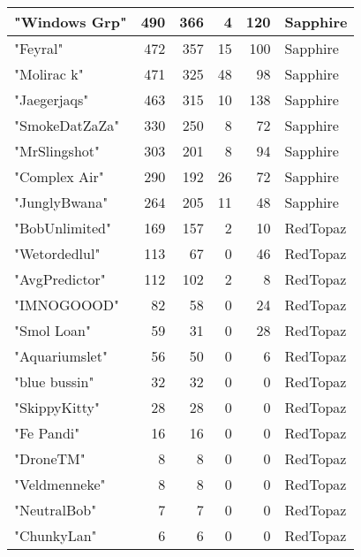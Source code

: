 \documentclass{article}
\begin{document}
\begin{table}[htbp]
\begin{tabular}{|l|r|r|r|r|l|}
"Windows Grp" & 490 & 366 & 4 & 120 & Sapphire \\ \hline
"Feyral" & 472 & 357 & 15 & 100 & Sapphire \\ \hline
"Molirac k" & 471 & 325 & 48 & 98 & Sapphire \\ \hline
"Jaegerjaqs" & 463 & 315 & 10 & 138 & Sapphire \\ \hline
"SmokeDatZaZa" & 330 & 250 & 8 & 72 & Sapphire \\ \hline
"MrSlingshot" & 303 & 201 & 8 & 94 & Sapphire \\ \hline
"Complex Air" & 290 & 192 & 26 & 72 & Sapphire \\ \hline
"JunglyBwana" & 264 & 205 & 11 & 48 & Sapphire \\ \hline
"BobUnlimited" & 169 & 157 & 2 & 10 & RedTopaz \\ \hline
"Wetordedlul" & 113 & 67 & 0 & 46 & RedTopaz \\ \hline
"AvgPredictor" & 112 & 102 & 2 & 8 & RedTopaz \\ \hline
"IMNOGOOOD" & 82 & 58 & 0 & 24 & RedTopaz \\ \hline
"Smol Loan" & 59 & 31 & 0 & 28 & RedTopaz \\ \hline
"Aquariumslet" & 56 & 50 & 0 & 6 & RedTopaz \\ \hline
"blue bussin" & 32 & 32 & 0 & 0 & RedTopaz \\ \hline
"SkippyKitty" & 28 & 28 & 0 & 0 & RedTopaz \\ \hline
"Fe Pandi" & 16 & 16 & 0 & 0 & RedTopaz \\ \hline
"DroneTM" & 8 & 8 & 0 & 0 & RedTopaz \\ \hline
"Veldmenneke" & 8 & 8 & 0 & 0 & RedTopaz \\ \hline
"NeutralBob" & 7 & 7 & 0 & 0 & RedTopaz \\ \hline
"ChunkyLan" & 6 & 6 & 0 & 0 & RedTopaz \\ \hline
\end{tabular}
\end{table}
\end{document}
